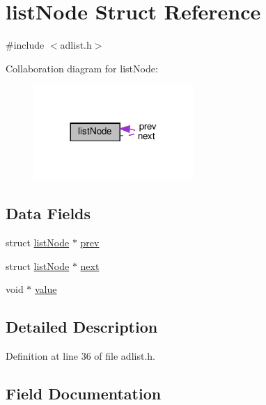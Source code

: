 \hypertarget{structlist_node}{}\section{list\+Node Struct Reference}
\label{structlist_node}


{\ttfamily \#include $<$adlist.\+h$>$}



Collaboration diagram for list\+Node\+:
\nopagebreak
\begin{figure}[H]
\begin{center}
\leavevmode
\includegraphics[width=173pt]{structlist_node__coll__graph}
\end{center}
\end{figure}
\subsection*{Data Fields}
\begin{DoxyCompactItemize}
\item 
struct \hyperlink{structlist_node}{list\+Node} $\ast$ \hyperlink{structlist_node_a58e66447fe4a91732b36e114d5c740bd}{prev}
\item 
struct \hyperlink{structlist_node}{list\+Node} $\ast$ \hyperlink{structlist_node_a4bc565cf125866bc99151319102fe748}{next}
\item 
void $\ast$ \hyperlink{structlist_node_a0f61d63b009d0880a89c843bd50d8d76}{value}
\end{DoxyCompactItemize}


\subsection{Detailed Description}


Definition at line 36 of file adlist.\+h.



\subsection{Field Documentation}
\mbox{\label{structlist_node_a4bc565cf125866bc99151319102fe748}} 
